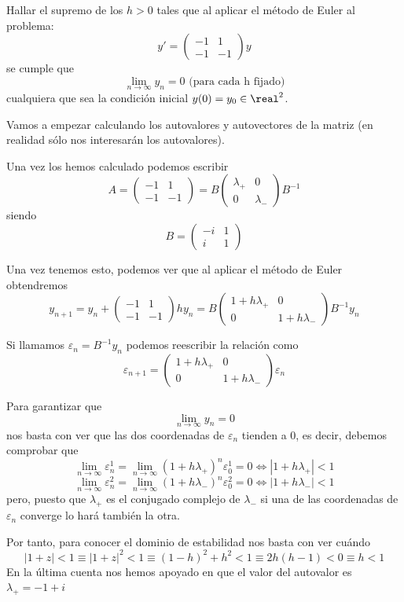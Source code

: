 \begin{problem}[3]
Hallar el supremo de los $h>0$ tales que al aplicar el método de Euler al problema:
\[y'=\left(\begin{array}{cc}-1 & 1 \\ -1 & -1 \end{array} \right)y\]
se cumple que
\[\lim_{n \to \infty}y_n=0 \text{ (para cada h fijado)}\]
cualquiera que sea la condición inicial $y(0)=y_0 \in \real^2$.
\solution

Vamos a empezar calculando los autovalores y autovectores de la matriz (en realidad sólo nos interesarán los autovalores).

Una vez los hemos calculado podemos escribir
\[A = \left(\begin{array}{cc}-1 & 1 \\ -1 & -1 \end{array} \right) = B\left(\begin{array}{cc}λ_+ & 0 \\ 0 & λ_- \end{array} \right)B^{-1}\]
siendo
\[B= \left(\begin{array}{cc}-i & 1 \\ i & 1 \end{array} \right)\]

Una vez tenemos esto, podemos ver que al aplicar el método de Euler obtendremos
\[y_{n+1} =y_n+\left(\begin{array}{cc}-1 & 1 \\ -1 & -1\end{array} \right)hy_n =  B \left(\begin{array}{cc}1+hλ_+ & 0 \\ 0 & 1+hλ_- \end{array} \right)B^{-1}y_n\]

Si llamamos $ε_n=B^{-1}y_n$ podemos reescribir la relación como
\[ε_{n+1} = \left(\begin{array}{cc}1+hλ_+ & 0 \\ 0 & 1+hλ_- \end{array} \right)ε_n\]

Para garantizar que
\[\lim_{n \to \infty}y_n=0\]
nos basta con ver que las dos coordenadas de $ε_n$ tienden a 0, es decir, debemos comprobar que
\[\lim_{n\to \infty}ε_n^1=\lim_{n \to \infty} (1+hλ_+)^nε_0^1 = 0 \iff |1+hλ_+|<1\]
\[\lim_{n\to \infty}ε_n^2=\lim_{n \to \infty} (1+hλ_-)^nε_0^2 = 0 \iff |1+hλ_-|<1\]
pero, puesto que $λ_+$ es el conjugado complejo de $λ_-$ si una de las coordenadas de $ε_n$ converge lo hará también la otra.

Por tanto, para conocer el dominio de estabilidad nos basta con ver cuándo
\[|1+z|<1 \equiv |1+z|^2 < 1 \equiv (1-h)^2+h^2 < 1 \equiv 2h(h-1)<0 \equiv h<1\]
\obs En la última cuenta nos hemos apoyado en que el valor del autovalor es $λ_+=-1+i$
\end{problem}


